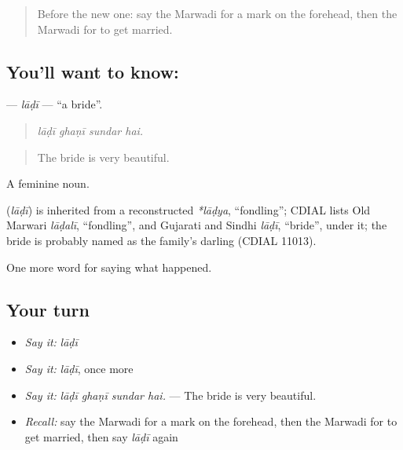 \label{lesson:MW-C247-ladi}



\begin{quote}
Before the new one: say the Marwadi for a mark on the forehead, then the Marwadi for to get married.
\end{quote}

\subsection*{You'll want to know: }
\textbf{} — \emph{lāḍī} — \textquotedblleft{}a bride\textquotedblright{}.

\begin{quote}
   
\end{quote}

\begin{quote}
\emph{lāḍī ghaṇī sundar hai.}
\end{quote}

\begin{quote}
The bride is very beautiful.
\end{quote}

A feminine noun.

\begin{cousinweb}
\textbf{} (\emph{lāḍī}) is inherited from a reconstructed \emph{*lāḍya}, \textquotedblleft{}fondling\textquotedblright{}; CDIAL lists Old Marwari \emph{lāḍalī}, \textquotedblleft{}fondling\textquotedblright{}, and Gujarati and Sindhi \emph{lāḍī}, \textquotedblleft{}bride\textquotedblright{}, under it; the bride is probably named as the family's darling (CDIAL 11013).
\end{cousinweb}

\begin{grammarlens}[title={What you've built}]
One more word for saying what happened.
\end{grammarlens}

\subsection*{Your turn}
\begin{itemize}
\raggedright
  \item \emph{Say it:} \emph{lāḍī}
  \item \emph{Say it:} \emph{lāḍī}, once more
  \item \emph{Say it:} \emph{lāḍī ghaṇī sundar hai.} — The bride is very beautiful.
  \item \emph{Recall:} say the Marwadi for a mark on the forehead, then the Marwadi for to get married, then say \emph{lāḍī} again
\end{itemize}

